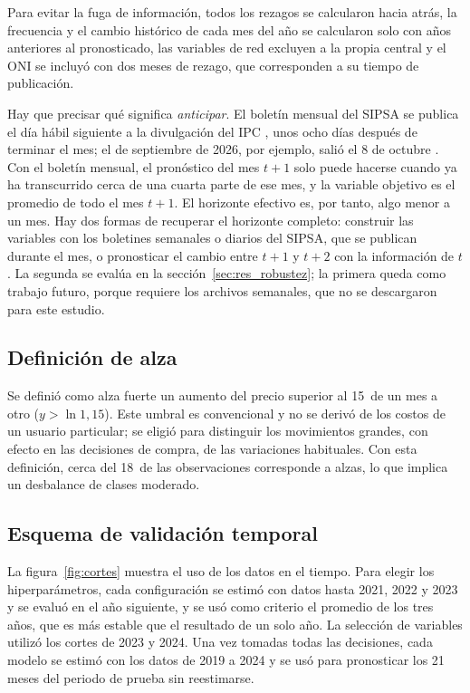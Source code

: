 Para evitar la fuga de información, todos los rezagos se calcularon hacia atrás, la frecuencia y el cambio histórico de cada mes del año se calcularon solo con años anteriores al pronosticado, las variables de red excluyen a la propia central y el ONI se incluyó con dos meses de rezago, que corresponden a su tiempo de publicación.

Hay que precisar qué significa \emph{anticipar}. El boletín mensual del SIPSA se publica el día hábil siguiente a la divulgación del IPC \citep{danefme2022}, unos ocho días después de terminar el mes; el de septiembre de 2026, por ejemplo, salió el 8 de octubre \citep{danebol2026}. Con el boletín mensual, el pronóstico del mes $t+1$ solo puede hacerse cuando ya ha transcurrido cerca de una cuarta parte de ese mes, y la variable objetivo es el promedio de todo el mes $t+1$. El horizonte efectivo es, por tanto, algo menor a un mes. Hay dos formas de recuperar el horizonte completo: construir las variables con los boletines semanales o diarios del SIPSA, que se publican durante el mes, o pronosticar el cambio entre $t+1$ y $t+2$ con la información de $t$. La segunda se evalúa en la sección~\ref{sec:res_robustez}; la primera queda como trabajo futuro, porque requiere los archivos semanales, que no se descargaron para este estudio.

\subsection{Definición de alza}

Se definió como alza fuerte un aumento del precio superior al 15\pct\ de un mes a otro ($y>\ln 1{,}15$). Este umbral es convencional y no se derivó de los costos de un usuario particular; se eligió para distinguir los movimientos grandes, con efecto en las decisiones de compra, de las variaciones habituales. Con esta definición, cerca del 18\pct\ de las observaciones corresponde a alzas, lo que implica un desbalance de clases moderado.

\subsection{Esquema de validación temporal}
\label{sec:esquema}

La figura~\ref{fig:cortes} muestra el uso de los datos en el tiempo. Para elegir los hiperparámetros, cada configuración se estimó con datos hasta 2021, 2022 y 2023 y se evaluó en el año siguiente, y se usó como criterio el promedio de los tres años, que es más estable que el resultado de un solo año. La selección de variables utilizó los cortes de 2023 y 2024. Una vez tomadas todas las decisiones, cada modelo se estimó con los datos de 2019 a 2024 y se usó para pronosticar los 21 meses del periodo de prueba sin reestimarse.

